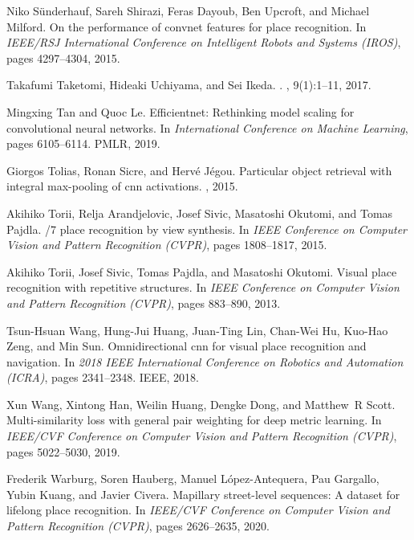\documentclass{article}
\begin{document}
\begin{thebibliography}{99}
Niko S{\"u}nderhauf, Sareh Shirazi, Feras Dayoub, Ben Upcroft, and Michael
  Milford.
\newblock On the performance of convnet features for place recognition.
\newblock In {\em IEEE/RSJ International Conference on Intelligent Robots and
  Systems (IROS)}, pages 4297--4304, 2015.

Takafumi Taketomi, Hideaki Uchiyama, and Sei Ikeda.
.
,
  9(1):1--11, 2017.

Mingxing Tan and Quoc Le.
\newblock Efficientnet: Rethinking model scaling for convolutional neural
  networks.
\newblock In {\em International Conference on Machine Learning}, pages
  6105--6114. PMLR, 2019.

Giorgos Tolias, Ronan Sicre, and Herv{\'e} J{\'e}gou.
\newblock Particular object retrieval with integral max-pooling of cnn
  activations.
, 2015.

Akihiko Torii, Relja Arandjelovic, Josef Sivic, Masatoshi Okutomi, and Tomas
  Pajdla.
/7 place recognition by view synthesis.
\newblock In {\em IEEE Conference on Computer Vision and Pattern Recognition
  (CVPR)}, pages 1808--1817, 2015.

Akihiko Torii, Josef Sivic, Tomas Pajdla, and Masatoshi Okutomi.
\newblock Visual place recognition with repetitive structures.
\newblock In {\em IEEE Conference on Computer Vision and Pattern Recognition
  (CVPR)}, pages 883--890, 2013.

Tsun-Hsuan Wang, Hung-Jui Huang, Juan-Ting Lin, Chan-Wei Hu, Kuo-Hao Zeng, and
  Min Sun.
\newblock Omnidirectional cnn for visual place recognition and navigation.
\newblock In {\em 2018 IEEE International Conference on Robotics and Automation
  (ICRA)}, pages 2341--2348. IEEE, 2018.

Xun Wang, Xintong Han, Weilin Huang, Dengke Dong, and Matthew~R Scott.
\newblock Multi-similarity loss with general pair weighting for deep metric
  learning.
\newblock In {\em IEEE/CVF Conference on Computer Vision and Pattern
  Recognition (CVPR)}, pages 5022--5030, 2019.

Frederik Warburg, Soren Hauberg, Manuel L{\'o}pez-Antequera, Pau Gargallo,
  Yubin Kuang, and Javier Civera.
\newblock Mapillary street-level sequences: A dataset for lifelong place
  recognition.
\newblock In {\em IEEE/CVF Conference on Computer Vision and Pattern
  Recognition (CVPR)}, pages 2626--2635, 2020.


\end{thebibliography}
\end{document}
